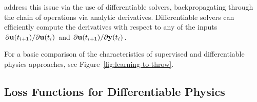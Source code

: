\cite{holl2019pdecontrol} address this issue via the use of differentiable
solvers, backpropagating through the chain of operations via analytic
derivatives.  Differentiable solvers can efficiently compute the derivatives
with respect to any of the inputs $\pdv*{\vb{u}(t_{i+1})}{\vb{u}(t_i)}$ and
$\pdv*{\vb{u}(t_{i+1})}{\vb{y}(t_i)}$. 


For a basic comparison of the characteristics of supervised and differentiable
physics approaches, see Figure~\ref{fig:learning-to-throw}.


\subsection{Loss Functions for Differentiable Physics}
\label{dp-loss}

